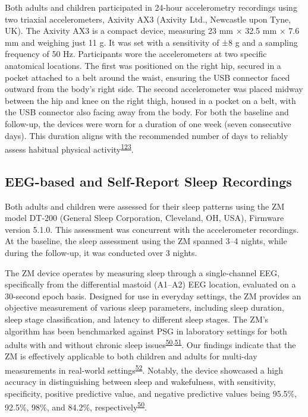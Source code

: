 \documentclass[
  10pt,
]{scrbook}
\begin{document}
Both adults and children participated in 24-hour accelerometry
recordings using two triaxial accelerometers, Axivity AX3 (Axivity Ltd.,
Newcastle upon Tyne, UK). The Axivity AX3 is a compact device, measuring
23 mm × 32.5 mm × 7.6 mm and weighing just 11 g. It was set with a
sensitivity of ±8 g and a sampling frequency of 50 Hz. Participants wore
the accelerometers at two specific anatomical locations. The first was
positioned on the right hip, secured in a pocket attached to a belt
around the waist, ensuring the USB connector faced outward from the
body's right side. The second accelerometer was placed midway between
the hip and knee on the right thigh, housed in a pocket on a belt, with
the USB connector also facing away from the body. For both the baseline
and follow-up, the devices were worn for a duration of one week (seven
consecutive days). This duration aligns with the recommended number of
days to reliably assess habitual physical
activity\textsuperscript{\protect\hyperlink{ref-jaeschke_variability_2018}{123}}.

\hypertarget{eeg-based-and-self-report-sleep-recordings}{%
\subsection{EEG-based and Self-Report Sleep
Recordings}\label{eeg-based-and-self-report-sleep-recordings}}

Both adults and children were assessed for their sleep patterns using
the ZM model DT-200 (General Sleep Corporation, Cleveland, OH, USA),
Firmware version 5.1.0. This assessment was concurrent with the
accelerometer recordings. At the baseline, the sleep assessment using
the ZM spanned 3--4 nights, while during the follow-up, it was conducted
over 3 nights.

The ZM device operates by measuring sleep through a single-channel EEG,
specifically from the differential mastoid (A1--A2) EEG location,
evaluated on a 30-second epoch basis. Designed for use in everyday
settings, the ZM provides an objective measurement of various sleep
parameters, including sleep duration, sleep stage classification, and
latency to different sleep stages. The ZM's algorithm has been
benchmarked against PSG in laboratory settings for both adults with and
without chronic sleep
issues\textsuperscript{\protect\hyperlink{ref-kaplan_performance_2014}{50},\protect\hyperlink{ref-wang_evaluation_2015}{51}}.
Our findings indicate that the ZM is effectively applicable to both
children and adults for multi-day measurements in real-world
settings\textsuperscript{\protect\hyperlink{ref-pedersen_self-administered_2021}{52}}.
Notably, the device showcased a high accuracy in distinguishing between
sleep and wakefulness, with sensitivity, specificity, positive
predictive value, and negative predictive values being 95.5\%, 92.5\%,
98\%, and 84.2\%,
respectively\textsuperscript{\protect\hyperlink{ref-kaplan_performance_2014}{50}}.
\end{document}
